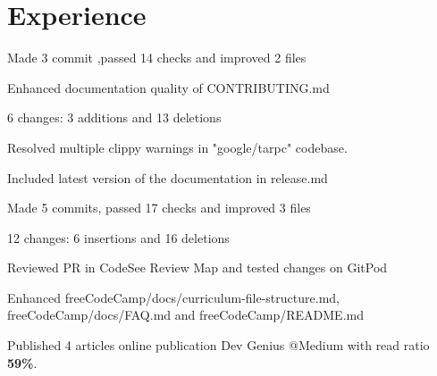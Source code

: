 \documentclass[]{deedy-resume-openfont}
\begin{document}
\begin{minipage}[t]{0.33\textwidth}
%
%

\end{minipage} 
\hfill
\begin{minipage}[t]{0.66\textwidth} 


\section{Experience}
\vspace{\topsep} %
\begin{tightemize}
\item Made 3 commit ,passed 14 checks and improved 2 files
\item Enhanced documentation quality of CONTRIBUTING.md 
\item 6 changes: 3 additions and 13 deletions
\item Resolved multiple clippy warnings in "google/tarpc" codebase.
\item Included latest version of the documentation in release.md
\end{tightemize}
\sectionsep

\vspace{\topsep} %
\begin{tightemize}
\item Made 5 commits, passed 17 checks and improved 3 files
\item 12 changes: 6 insertions and 16 deletions
\item Reviewed PR in CodeSee Review Map and tested changes on GitPod
\item Enhanced freeCodeCamp/docs/curriculum-file-structure.md, freeCodeCamp/docs/FAQ.md and freeCodeCamp/README.md
\end{tightemize}
\sectionsep

\begin{tightemize}
\item Published 4 articles online publication Dev Genius @Medium with read ratio \textbf{59\%}.
\end{tightemize}
\sectionsep


\end{minipage}
\end{document}
